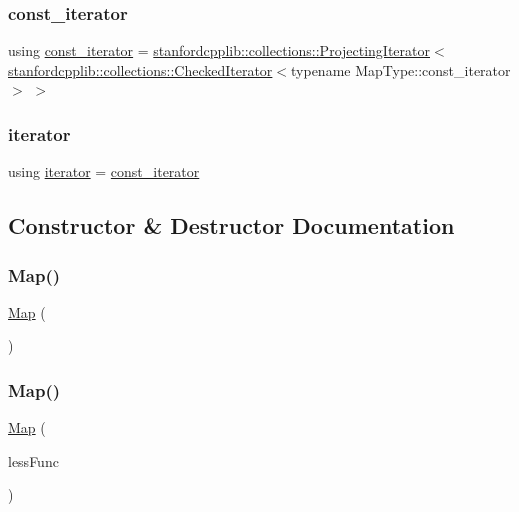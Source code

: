 \subsubsection{\texorpdfstring{const\+\_\+iterator}{const\_iterator}}
{\footnotesize\ttfamily using \mbox{\hyperlink{classMap_a04e3b848cce2bbfed5ea818e1b264000}{const\+\_\+iterator}} =  \mbox{\hyperlink{classstanfordcpplib_1_1collections_1_1ProjectingIterator}{stanfordcpplib\+::collections\+::\+Projecting\+Iterator}}$<$\mbox{\hyperlink{classstanfordcpplib_1_1collections_1_1CheckedIterator}{stanfordcpplib\+::collections\+::\+Checked\+Iterator}}$<$typename Map\+Type\+::const\+\_\+iterator$>$ $>$}

\mbox{\label{classMap_ab3d10e70baaeac78e76b7abae7e2cf76}} 
\subsubsection{\texorpdfstring{iterator}{iterator}}
{\footnotesize\ttfamily using \mbox{\hyperlink{classMap_ab3d10e70baaeac78e76b7abae7e2cf76}{iterator}} =  \mbox{\hyperlink{classMap_a04e3b848cce2bbfed5ea818e1b264000}{const\+\_\+iterator}}}



\subsection{Constructor \& Destructor Documentation}
\mbox{\label{classMap_a49848ab3a0e1934c5615242b67af68c7}} 
\subsubsection{\texorpdfstring{Map()}{Map()}\hspace{0.1cm}{\footnotesize\ttfamily [1/4]}}
{\footnotesize\ttfamily \mbox{\hyperlink{classMap}{Map}} (\begin{DoxyParamCaption}{ }\end{DoxyParamCaption})}

\mbox{\label{classMap_afeeb032b309df7c22d2640f98e0dd9a4}} 
\subsubsection{\texorpdfstring{Map()}{Map()}\hspace{0.1cm}{\footnotesize\ttfamily [2/4]}}
{\footnotesize\ttfamily \mbox{\hyperlink{classMap}{Map}} (\begin{DoxyParamCaption}\item[{std\+::function$<$ bool(const Key\+Type \&, const Key\+Type \&)$>$}]{less\+Func }\end{DoxyParamCaption})}

